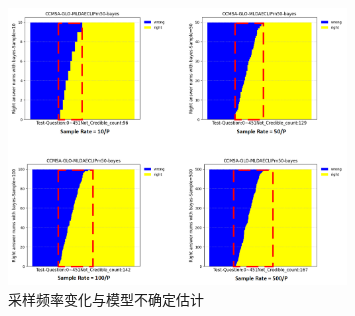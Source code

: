 \begin{figure}[htbp]
	\centering	
	\includegraphics[width=0.8\textwidth]{Fig/myfig/chapter4/sample_sum.png}  %
	\caption{\label{sample_sum}采样频率变化与模型不确定估计} 
\end{figure}

